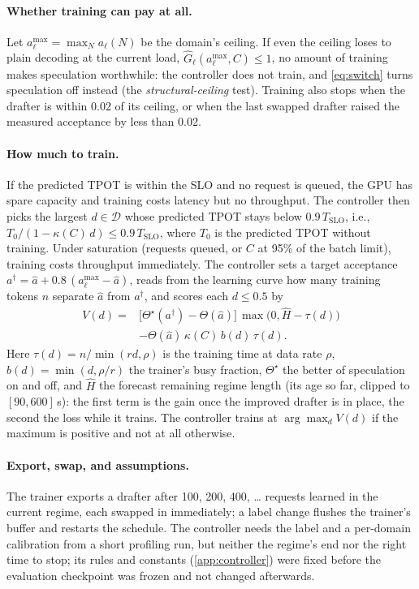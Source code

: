 \documentclass{article}
\newcommand{\Ghat}{\widehat{G}}
\newcommand{\amax}{a^{\max}}
\newcommand{\Tslo}{T_{\mathrm{SLO}}}
\begin{document}
\paragraph{Whether training can pay at all.} Let $\amax_\ell=\max_N a_\ell(N)$ be the domain's ceiling. If even the ceiling loses to plain decoding at the current load, $\Ghat_\ell(\amax_\ell,C)\le1$, no amount of training makes speculation worthwhile: the controller does not train, and \cref{eq:switch} turns speculation off instead (the \emph{structural-ceiling} test). Training also stops when the drafter is within 0.02 of its ceiling, or when the last swapped drafter raised the measured acceptance by less than 0.02.

\paragraph{How much to train.} If the predicted TPOT is within the SLO and no request is queued, the GPU has spare capacity and training costs latency but no throughput. The controller then picks the largest $d\in\mathcal D$ whose predicted TPOT stays below $0.9\,\Tslo$, i.e., $T_0/(1-\kappa(C)\,d)\le0.9\,\Tslo$, where $T_0$ is the predicted TPOT without training. Under saturation (requests queued, or $C$ at 95\% of the batch limit), training costs throughput immediately. The controller sets a target acceptance $a^{\dagger}=\hat a+0.8\,(\amax_\ell-\hat a)$, reads from the learning curve how many training tokens $n$ separate $\hat a$ from $a^{\dagger}$, and scores each $d\le0.5$ by
\begin{equation}
\begin{aligned}
V(d)={}&\big[\Theta^{\star}(a^{\dagger})-\Theta(\hat a)\big]\,\max\!\big(0,\widehat H-\tau(d)\big)\\
&-\Theta(\hat a)\,\kappa(C)\,b(d)\,\tau(d).
\end{aligned}\label{eq:value}
\end{equation}
Here $\tau(d)=n/\min(rd,\rho)$ is the training time at data rate $\rho$, $b(d)=\min(d,\rho/r)$ the trainer's busy fraction, $\Theta^{\star}$ the better of speculation on and off, and $\widehat H$ the forecast remaining regime length (its age so far, clipped to $[90,600]$\,s): the first term is the gain once the improved drafter is in place, the second the loss while it trains. The controller trains at $\arg\max_d V(d)$ if the maximum is positive and not at all otherwise.

\paragraph{Export, swap, and assumptions.} The trainer exports a drafter after 100, 200, 400, \dots{} requests learned in the current regime, each swapped in immediately; a label change flushes the trainer's buffer and restarts the schedule. The controller needs the label and a per-domain calibration from a short profiling run, but neither the regime's end nor the right time to stop; its rules and constants (\cref{app:controller}) were fixed before the evaluation checkpoint was frozen and not changed afterwards.
\end{document}
